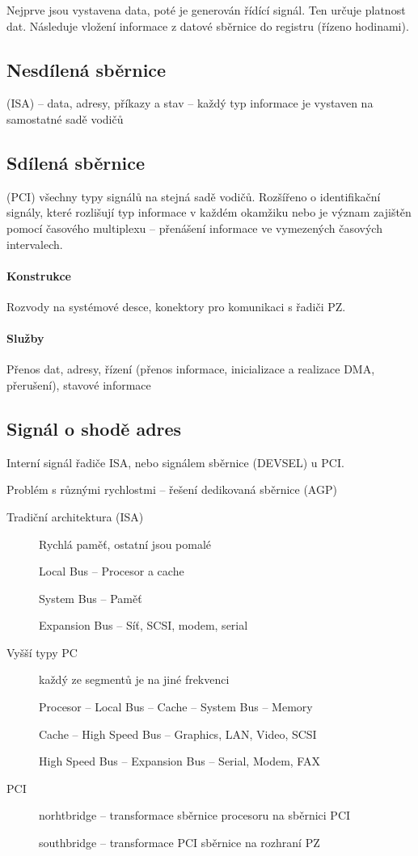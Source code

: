 \documentclass[a4paper, 11pt]{report}
\begin{document}
Nejprve jsou vystavena data, poté je generován řídící signál. Ten určuje platnost dat. Následuje vložení informace z datové sběrnice do registru (řízeno hodinami).

\subsection{Nesdílená sběrnice}
(ISA) -- data, adresy, příkazy a stav -- každý typ informace je vystaven na samostatné sadě vodičů

\subsection{Sdílená sběrnice}
(PCI) všechny typy signálů na stejná sadě vodičů. Rozšířeno o identifikační signály, které rozlišují typ informace v každém okamžiku nebo je význam zajištěn pomocí časového multiplexu -- přenášení informace ve vymezených časových intervalech.

\paragraph{Konstrukce} Rozvody na systémové desce, konektory pro komunikaci s řadiči PZ.

\paragraph{Služby} Přenos dat, adresy, řízení (přenos informace, inicializace a realizace DMA, přerušení), stavové informace

\subsection{Signál o shodě adres}
Interní signál řadiče ISA, nebo signálem sběrnice (DEVSEL) u PCI.

Problém s různými rychlostmi -- řešení dedikovaná sběrnice (AGP)

\begin{description}
	\item[Tradiční architektura (ISA)] Rychlá paměť, ostatní jsou pomalé
	
	Local Bus -- Procesor a cache
	
	System Bus -- Paměť
	
	Expansion Bus -- Síť, SCSI, modem, serial
	
	\item[Vyšší typy PC] každý ze segmentů je na jiné frekvenci
	
	Procesor -- Local Bus -- Cache -- System Bus -- Memory
	
	Cache -- High Speed Bus -- Graphics, LAN, Video, SCSI
	
	High Speed Bus -- Expansion Bus -- Serial, Modem, FAX
	
	\item[PCI]
	
	norhtbridge -- transformace sběrnice procesoru na sběrnici PCI
	
	southbridge -- transformace PCI sběrnice na rozhraní PZ
\end{description}
\end{document}
